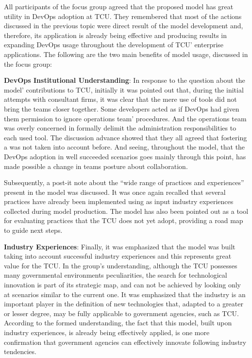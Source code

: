 {
\color{blue}
All participants of the focus group agreed that the proposed model has great
utility in DevOps adoption at TCU. They remembered that most of the actions
discussed in the previous topic were direct result of the model development and,
therefore, its application is already being effective and producing results in
expanding DevOps usage throughout the development of TCU' enterprise applications.
The following are the two main benefits of model usage, discussed in the focus
group:

\textbf{DevOps Institutional Understanding}: In response to the question about
the model' contributions to TCU, initially it was pointed out that, during the
initial attempts with consultant firms, it was clear that the mere use of
tools did not bring the teams closer together. Some developers acted as if DevOps
had given them permission to ignore operations team' procedures. And the
operations team was overly concerned in formally delimit the administration
responsibilities to each used tool. The discussion advance showed that they all
agreed that fostering a \cc was not taken into account before. And seeing,
throughout the model, that the DevOps adoption in well succeeded scenarios goes
mainly through this point, has made possible a change in teams posture about
collaboration.

Subsequently, a post-it note about the ``wide range of practices and experiences''
present in the model was discussed. It was once again recalled that several
practices have already been implemented using as input industry experiences
collected during model production. The model has also been pointed out as a tool
for evaluating practices that the TCU does not yet adopt, providing a road map
to guide next steps.

\textbf{Industry Experiences}: Finally, it was emphasized that the model was
built taking into account successful industry experiences and this represents
great value for the TCU. In the group's understanding, although the TCU
possesses many governmental environments peculiarities, the search for
technological innovation is part of its strategic map, and can not be achieved
by looking only at scenarios similar to the current one. It was emphasized that
the industry is an important player in the definition of new technologies that,
adapted to a greater or lesser degree, may be fully applicable to government
agencies, such as TCU. According to the formed understanding, the fact that this
model, built upon industry experiences, is already being effectively applied, is
one more confirmation that government agencies can effectively innovate following
industry tendencies.
}

